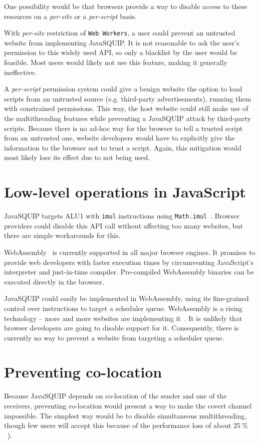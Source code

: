 \documentclass[11pt,
  titlepage=false,
  parskip=half,      %
]{scrreprt}
\begin{document}
One possibility would be that browsers provide a way to disable access to these resources on a \textit{per-site} or a \textit{per-script} basis.

With \textit{per-site} restriction of \texttt{Web Workers}, a user could prevent an untrusted website from implementing JavaSQUIP.
It is not reasonable to ask the user's permission to this widely used API,
so only a blacklist by the user would be feasible.
Most users would likely not use this feature, making it generally ineffective.

A \textit{per-script} permission system could give a benign website the option to load scripts from an untrusted source (e.g. third-party advertisements),
running them with constrained permissions.
This way, the host website could still make use of the multithreading features while preventing a JavaSQUIP attack by third-party scripts.
Because there is no ad-hoc way for the browser to tell a trusted script from an untrusted one,
website developers would have to explicitly give the information to the browser not to trust a script.
Again, this mitigation would most likely lose its effect due to not being used.

\section{Low-level operations in JavaScript}
JavaSQUIP targets ALU1 with \texttt{imul} instructions using \texttt{Math.imul}~\cite{mathimul}.
Browser providers could disable this API call without affecting too many websites,
but there are simple workarounds for this.

WebAssembly~\cite{webassembly} is currently supported in all major browser engines.
It promises to provide web developers with faster execution times by circumventing JavaScript's interpreter and just-in-time compiler.
Pre-compiled WebAssembly binaries can be executed directly in the browser.

JavaSQUIP could easily be implemented in WebAssembly, using its fine-grained control over instructions to
target a scheduler queue.
WebAssembly is a rising technology -- more and more websites are implementing it~\cite{musch2019new}.
It is unlikely that browser developers are going to disable support for it.
Consequently, there is currently no way to prevent a website from targeting a scheduler queue.

\section{Preventing co-location}
Because JavaSQUIP depends on co-location of the sender and one of the receivers,
preventing co-location would present a way to make the covert channel impossible.
The simplest way would be to disable simultaneous multithreading,
though few users will accept this because of the performance loss of about $25~\%$~\cite{Phoronix2018HT, Cutress2020SMT}).
\end{document}
